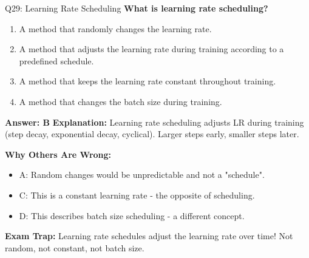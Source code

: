 \documentclass[8pt]{beamer}
\begin{document}
	\begin{frame}{Q29: Learning Rate Scheduling}
		\fontsize{6.5}{7.5}\selectfont
		\textbf{What is learning rate scheduling?}
		
		\begin{enumerate}
			\item A method that randomly changes the learning rate.
			\item A method that adjusts the learning rate during training according to a predefined schedule.
			\item A method that keeps the learning rate constant throughout training.
			\item A method that changes the batch size during training.
		\end{enumerate}
		
		\vspace{0.05cm}
		\textcolor{myblue}{\textbf{Answer: B}}
		\vspace{0.05cm}
		\textcolor{myblue}{\textbf{Explanation:}} Learning rate scheduling adjusts LR during training (step decay, exponential decay, cyclical). Larger steps early, smaller steps later.
		
		\vspace{0.05cm}
		\textcolor{myred}{\textbf{Why Others Are Wrong:}}
		\begin{itemize}
			\item \textcolor{myred}{A:} Random changes would be unpredictable and not a "schedule".
			\item \textcolor{myred}{C:} This is a constant learning rate - the opposite of scheduling.
			\item \textcolor{myred}{D:} This describes batch size scheduling - a different concept.
		\end{itemize}
		
		\textcolor{myred}{\textbf{Exam Trap:}} Learning rate schedules \textcolor{myblue}{adjust the learning rate over time}! Not random, not constant, not batch size.
	\end{frame}
	
\end{document}
